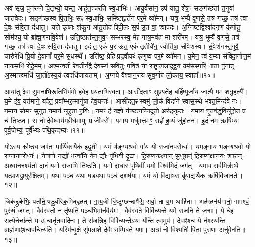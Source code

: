 अव॑ सृज॒ पुन॑रग्ने पि॒तृभ्यो॒ यस्त॒ आहु॑त॒श्चर॑ति स्व॒धाभिः॑। 
आयु॒र्वसा॑न॒ उप॑ यातु॒ शेष॒ꣳ॒ सङ्ग॑च्छतां त॒नुवा॑ जातवेदः। 
सङ्ग॑च्छस्व पि॒तृभिः॒ सꣴ स्व॒धाभिः॒ समि॑ष्टापू॒र्तेन॑ पर॒मे व्यो॑मन्। 
यत्र॒ भूम्यै॑ वृ॒णसे॒ तत्र॑ गच्छ॒ तत्र॑ त्वा दे॒वः स॑वि॒ता द॑धातु। 
यत्ते॑ कृ॒ष्णः  श॑कु॒न आ॑तु॒तोद॑ पिपी॒लः स॒र्प उ॒त वा॒ श्वाप॑दः। 
अ॒ग्निष्टद्विश्वा॑दनृ॒णं कृ॑णोतु॒ सोम॑श्च॒ यो ब्रा᳚ह्म॒णमा॑वि॒वेश॑। 
उत्ति॒ष्ठात॑स्त॒नुव॒ꣳ॒ सम्भ॑रस्व॒ मेह गात्र॒मव॑हा॒ मा शरी॑रम्। 
यत्र॒ भूम्यै॑ वृ॒णसे॒ तत्र॑ गच्छ॒ तत्र॑ त्वा दे॒वः स॑वि॒ता द॑धातु। 
इ॒दं त॒ एकं॑ प॒र ऊ॑त॒ एकं॑ तृ॒तीये॑न॒ ज्योति॑षा॒ संवि॑शस्व। 
सं॒वेश॑नस्त॒नुवै॒ चारु॑रेधि प्रि॒यो दे॒वानां᳚ पर॒मे स॒धस्थे᳚। 
उत्ति॑ष्ठ॒ प्रेहि॒ प्रद्र॒वौकः॑ कृणुष्व पर॒मे व्यो॑मन्। 
य॒मेन॒ त्वं य॒म्या॑ संविदा॒नोत्त॒मं नाक॒मधि॑ रोहे॒मम्। 
अश्म॑न्वती रेवती॒र्यद्वै दे॒वस्य॑ सवि॒तुः प॒वित्रं॒ या रा॒ष्ट्रात्प॒न्नादुद्व॒यं तम॑स॒स्परि॑ धा॒ता पु॑नातु। 
अ॒स्मात्त्वमधि॑ जा॒तो᳚ऽस्य॒यं त्वदधि॑जायताम्। 
अ॒ग्नये॑ वैश्वान॒राय॑ सुव॒र्गाय॑ लो॒काय॒ स्वाहा᳚॥१०॥
\anuvakamend[अव॑शीयताꣳ स॒धस्थे॒ पञ्च॑ च]

आया॑तु दे॒वः सु॒मना॑भिरू॒तिभि॑र्य॒मो ह॑वे॒ह प्रय॑ताभिर॒क्ता। 
आसी॑दताꣳ सुप्र॒यते॑ह ब॒र्\mbox{}हिष्यूर्जा॑य जा॒त्यै मम॑ शत्रु॒हत्यै᳚। 
य॒मे इ॑व॒ यत॑माने॒ यदैतं॒ प्रवा᳚म्भर॒न्मानु॑षा देव॒यन्तः॑। 
आसी॑दत॒ꣴ॒ स्वमु॑ लो॒कं  विदा॑ने स्वास॒स्थे भ॑वत॒मिन्द॑वे नः। 
य॒माय॒ सोमꣳ॑ सुनुत य॒माय॑ जुहुता ह॒विः। 
य॒मꣳ ह॑ य॒ज्ञो ग॑च्छत्य॒ग्निदू॑तो॒ अर॑ङ्कृतः। 
य॒माय॑ घृ॒तव॑द्ध॒विर्जु॒होत॒ प्र च॑ तिष्ठत। 
स नो॑ दे॒वेष्वाय॑मद्दी॒र्घमायुः॒ प्र जी॒वसे᳚। 
य॒माय॒ मधु॑मत्तम॒ꣳ॒ राज्ञे॑ ह॒व्यं जु॑होतन। 
इ॒दं नम॒ ऋषि॑भ्यः पूर्व॒जेभ्यः॒ पूर्वे᳚भ्यः पथि॒कृद्भ्यः॑॥११॥

योऽस्य॒ कौष्ठ्य॒ जग॑तः॒ पार्थि॑व॒स्यैक॑ इद्व॒शी। 
य॒मं भ॑ङ्ग्यश्र॒वो गा॑य॒ यो राजा॑नप॒रोध्यः॑। 
य॒मङ्गाय॑ भङ्ग्य॒श्रवो॒ यो राजा॑नप॒रोध्यः॑। 
येना॒पो न॒द्यो॑ धन्वा॑नि॒ येन॒ द्यौः पृ॑थि॒वी दृ॒ढा। 
हि॒र॒ण्य॒क॒क्ष्यान् सु॒धुरान्॑ हिरण्या॒क्षान॑यः  श॒फान्। 
अश्वा॑न॒नश्य॑तो दा॒नं॒ य॒मो रा॑जाभि॒ तिष्ठ॑ति। 
य॒मो दा॑धार पृथि॒वीं य॒मो विश्व॑मि॒दं जग॑त्। 
य॒माय॒ सर्व॒मित्र॑स्थे॒ यत्प्रा॒णद्वा॒युर॑क्षि॒तम्। 
यथा॒ पञ्च॒ यथा॒ षड्य॒था पञ्च॑ द॒शर्\mbox{}ष॑यः। 
य॒मं यो वि॑द्या॒थ्स ब्रू॑याद्य॒थैक ऋषि॑र्विजान॒ते॥१२॥

त्रिक॑द्रुकेभिः॒ पत॑ति॒ षडु॒र्वीरेक॒मिद्बृ॒हत्। 
गा॒य॒त्री त्रि॒ष्टुप्छन्दाꣳ॑सि॒ सर्वा॒ ता य॒म आहि॑ता। 
अह॑रह॒र्नय॑मानो॒ गामश्वं॒ पुरु॑षं॒ जग॑त्। 
वैव॑स्वतो॒ न तृ॑प्यति॒ पञ्च॑भि॒र्मान॑वैर्य॒मः। 
वैव॑स्वते॒ विवि॑च्यन्ते॒ यमे॒ राज॑नि ते ज॒नाः। 
ये चे॒ह स॒त्येनेच्छ॑न्ते॒ य उ॒ चानृ॑तवादि॒नः। 
ते रा॑जन्नि॒ह विवि॑च्यन्ते॒ऽथा य॑न्ति त्वा॒मुप॑। 
दे॒वाꣴश्च॒ ये न॑म॒स्यन्ति॒ ब्राह्म॑णाꣴश्चाप॒चित्य॑ति। 
यस्मि॑न्वृ॒क्षे सु॑पला॒शे दे॒वैः स॒म्पिब॑ते य॒मः। 
अत्रा॑ नो वि॒श्पतिः॑ पि॒ता पु॑रा॒णा अनु॑वेनति॥१३॥
\anuvakamend[प॒थि॒कृद्भ्यो॑ विजान॒तेऽनु॑ वेनति]

